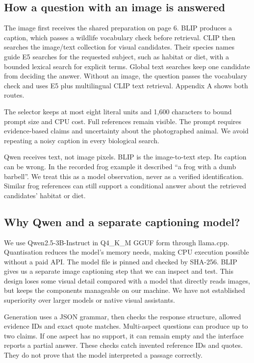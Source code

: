 \documentclass[10pt,a4paper]{article}
\begin{document}
\subsection*{How a question with an image is answered}
The image first receives the shared preparation on page 6. BLIP produces a caption, which passes a wildlife vocabulary check before retrieval. CLIP then searches the image/text collection for visual candidates. Their species names guide E5 searches for the requested subject, such as habitat or diet, with a bounded lexical search for explicit terms. Global text searches keep one candidate from deciding the answer. Without an image, the question passes the vocabulary check and uses E5 plus multilingual CLIP text retrieval. Appendix A shows both routes.

The selector keeps at most eight literal units and 1,600 characters to bound prompt size and CPU cost. Full references remain visible. The prompt requires evidence-based claims and uncertainty about the photographed animal. We avoid repeating a noisy caption in every biological search.

Qwen receives text, not image pixels. BLIP is the image-to-text step. Its caption can be wrong. In the recorded frog example it described ``a frog with a dumb barbell''. We treat this as a model observation, never as a verified identification. Similar frog references can still support a conditional answer about the retrieved candidates' habitat or diet.

\subsection*{Why Qwen and a separate captioning model?}
We use Qwen2.5-3B-Instruct in Q4\_K\_M GGUF form through llama.cpp. Quantisation reduces the model's memory needs, making CPU execution possible without a paid API. The model file is pinned and checked by SHA-256. BLIP gives us a separate image captioning step that we can inspect and test. This design loses some visual detail compared with a model that directly reads images, but keeps the components manageable on our machine. We have not established superiority over larger models or native visual assistants.

Generation uses a JSON grammar, then checks the response structure, allowed evidence IDs and exact quote matches. Multi-aspect questions can produce up to two claims. If one aspect has no support, it can remain empty and the interface reports a partial answer. These checks catch invented reference IDs and quotes. They do not prove that the model interpreted a passage correctly.
\end{document}

